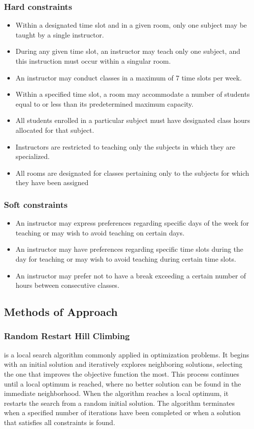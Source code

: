 \documentclass[runningheads]{paper}
\begin{document}
\subsubsection*{Hard constraints}
\begin{itemize}
    \item Within a designated time slot and in a given room, only one subject may be taught by a single instructor.
    \item During any given time slot, an instructor may teach only one subject, and this instruction must occur within a singular room.
    \item An instructor may conduct classes in a maximum of 7 time slots per week.
    \item Within a specified time slot, a room may accommodate a number of students equal to or less than its predetermined maximum capacity.
    \item All students enrolled in a particular subject must have designated class hours allocated for that subject.
    \item Instructors are restricted to teaching only the subjects in which they are specialized.
    \item All rooms are designated for classes pertaining only to the subjects for which they have been assigned
\end{itemize}

\subsubsection*{Soft constraints}
\begin{itemize}
    \item An instructor may express preferences regarding specific days of the week for teaching or may wish to avoid teaching on certain days.
    \item An instructor may have preferences regarding specific time slots during the day for teaching or may wish to avoid teaching during certain time slots.
    \item An instructor may prefer not to have a break exceeding a certain number of hours between consecutive classes.
\end{itemize}
% 

\subsection{Methods of Approach}
\subsubsection{Random Restart Hill Climbing}
is a local search algorithm commonly applied in optimization 
problems. It begins with an initial solution and iteratively explores 
neighboring solutions, selecting the one that improves the objective function 
the most. This process continues until a local optimum is reached, where no 
better solution can be found in the immediate neighborhood. When the algorithm
reaches a local optimum, it restarts the search from a random initial solution.
The algorithm terminates when a specified number of iterations have been
completed or when a solution that satisfies all constraints is found.
\end{document}
